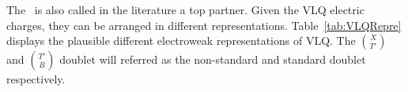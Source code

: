 The \Tp~is also called in the literature a top partner. Given the VLQ electric charges, they can be arranged in different representations. Table~\ref{tab:VLQRepre} displays the plausible different electroweak representations of VLQ. The $\binom{X}{T'}$ and $\binom{T'}{B}$ doublet will referred as the non-standard and standard doublet respectively.  

\begin{table}[htbH]
\begin{center}
\caption{Possible VLQ representations and corresponding $SU(2)_{L}\times U(1)$ charges and SM quarks. \label{tab:VLQRepre}}
\end{center}
\end{table}

